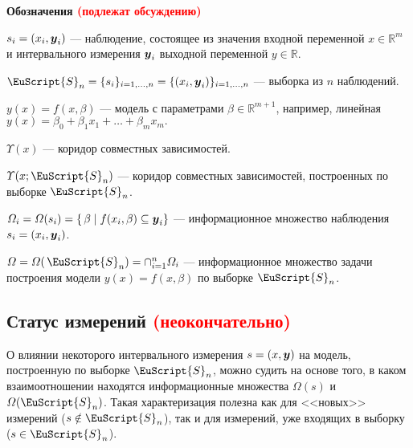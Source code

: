 \documentclass[a5paper,openany]{book}
\newcommand{\mbf}[1]{\protect\text{\boldmath$#1$}}
\newcommand{\mbb}{\mathbb}
\newcommand{\eus}{\EuScript}
\begin{document}
   
  
\textbf{Обозначения \textcolor{red}{(подлежат обсуждению)}}
  
$s_i = (x_i,\mbf{y}_i)$ --- наблюдение, состоящее из значения входной переменной 
$x\in\mbb{R}^{m}$ и   интервального измерения $\mbf{y}_i$ выходной переменной 
$y\in \mbb{R}$. 
  
$\eus{S}_{n} = \{s_i\}_{i=1,\dots,n} = \{(x_i,\mbf{y}_i)\}_{i=1,\dots,n}$ --- выборка 
из $n$ наблюдений.

$y(x) = f(x,\beta)$ --- модель с параметрами $\beta \in \mbb{R}^{m+1}$, например, 
линейная $y(x) = \beta_0 + \beta_1 x_1 + \ldots + \beta_m x_m.$

$\varUpsilon(x)$ --- коридор совместных зависимостей. 

 
 

$\varUpsilon(x; \eus{S}_{n})$ --- коридор совместных зависимостей, построенных 
по выборке $\eus{S}_{n}$. 


$\varOmega_i = \varOmega(s_i) = \{\,\beta \mid f(x_i,\beta) \subseteq \mbf{y}_i\}$ 
--- информационное множество наблюдения $s_i  = (x_i, \mbf{y}_i)$.

$\varOmega = \varOmega(\,\eus{S}_{n}) = \cap_{i=1}^n \varOmega_i$ --- информационное 
множество задачи построения модели $y(x) = f(x,\beta)$ по выборке  $\eus{S}_{n}$.
  
  
\subsection{Статус измерений \textcolor{red}{(неокончательно)}} 
\label{MeasrStatusSect}
  
О влиянии некоторого интервального измерения $s = (x,\mbf{y})$ на модель, построенную 
по выборке $\eus{S}_{n}$, можно судить на основе того, в каком взаимоотношении находятся 
информационные множества $\varOmega(s)$ и $\varOmega(\eus{S}_{n})$. Такая характеризация 
полезна как для <<новых>> измерений ($s \notin \eus{S}_{n}$), так и для измерений, уже 
входящих в выборку ($s \in \eus{S}_{n}$). 
  
\end{document}
